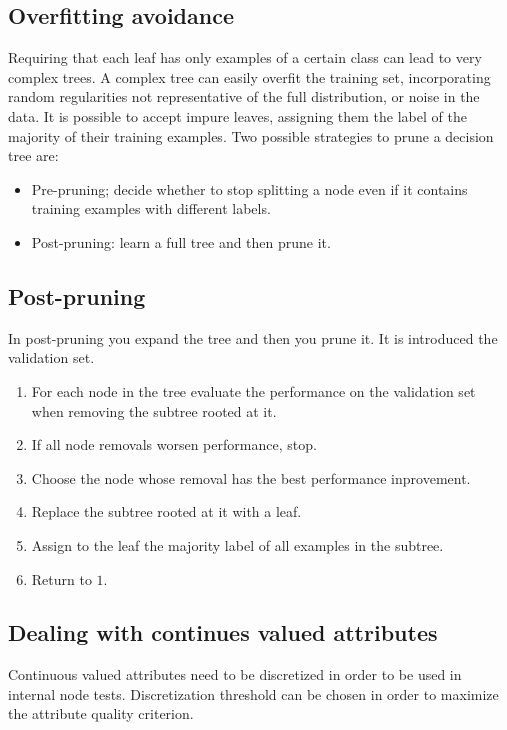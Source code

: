 	\subsection{Overfitting avoidance}
	Requiring that each leaf has only examples of a certain class can lead to very complex trees.
	A complex tree can easily overfit the training set, incorporating random regularities not representative of the full distribution, or noise in the data.
	It is possible to accept impure leaves, assigning them the label of the majority of their training examples.
	Two possible strategies to prune a decision tree are:

	\begin{multicols}{2}
		\begin{itemize}
			\item Pre-pruning; decide whether to stop splitting a node even if it contains training examples with different labels.
			\item Post-pruning: learn a full tree and then prune it.
		\end{itemize}
	\end{multicols}

	\subsection{Post-pruning}
	In post-pruning you expand the tree and then you prune it.
	It is introduced the validation set.

	\begin{multicols}{2}
		\begin{enumerate}
			\item For each node in the tree evaluate the performance on the validation set when removing the subtree rooted at it.
			\item If all node removals worsen performance, stop.
			\item Choose the node whose removal has the best performance inprovement.
			\item Replace the subtree rooted at it with a leaf.
			\item Assign to the leaf the majority label of all examples in the subtree.
			\item Return to $1$.
		\end{enumerate}
	\end{multicols}

	\subsection{Dealing with continues valued attributes}
	Continuous valued attributes need to be discretized in order to be used in internal node tests.
	Discretization threshold can be chosen in order to maximize the attribute quality criterion.


